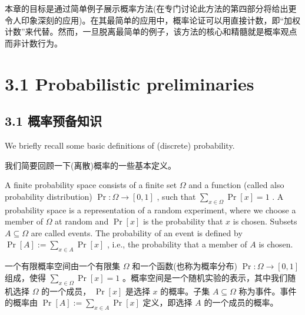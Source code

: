 \documentclass[10pt]{article}
\begin{document}
\begin{tcolorbox}\relax
本章的目标是通过简单例子展示概率方法(在专门讨论此方法的第四部分将给出更令人印象深刻的应用)。在其最简单的应用中，概率论证可以用直接计数，即“加权计数”来代替。然而，一旦脱离最简单的例子，该方法的核心和精髓就是概率观点而非计数行为。
\end{tcolorbox}

\section*{3.1 Probabilistic preliminaries}

\begin{tcolorbox}\relax
\section*{3.1 概率预备知识}
\end{tcolorbox}

We briefly recall some basic definitions of (discrete) probability.

\begin{tcolorbox}\relax
我们简要回顾一下(离散)概率的一些基本定义。
\end{tcolorbox}

A finite probability space consists of a finite set \(\Omega\) and a function (called also probability distribution) \(\Pr  : \Omega  \rightarrow  \left\lbrack  {0,1}\right\rbrack\) , such that \(\mathop{\sum }\limits_{{x \in  \Omega }}\Pr \left\lbrack  x\right\rbrack   = 1\) . A probability space is a representation of a random experiment, where we choose a member of \(\Omega\) at random and \(\Pr \left\lbrack  x\right\rbrack\) is the probability that \(x\) is chosen. Subsets \(A \subseteq  \Omega\) are called events. The probability of an event is defined by \(\Pr \left\lbrack  A\right\rbrack   \mathrel{\text{ := }} \mathop{\sum }\limits_{{x \in  A}}\Pr \left\lbrack  x\right\rbrack\) , i.e., the probability that a member of \(A\) is chosen.

\begin{tcolorbox}\relax
一个有限概率空间由一个有限集 \(\Omega\) 和一个函数(也称为概率分布) \(\Pr  : \Omega  \rightarrow  \left\lbrack  {0,1}\right\rbrack\) 组成，使得 \(\mathop{\sum }\limits_{{x \in  \Omega }}\Pr \left\lbrack  x\right\rbrack   = 1\) 。概率空间是一个随机实验的表示，其中我们随机选择 \(\Omega\) 的一个成员， \(\Pr \left\lbrack  x\right\rbrack\) 是选择 \(x\) 的概率。子集 \(A \subseteq  \Omega\) 称为事件。事件的概率由 \(\Pr \left\lbrack  A\right\rbrack   \mathrel{\text{ := }} \mathop{\sum }\limits_{{x \in  A}}\Pr \left\lbrack  x\right\rbrack\) 定义，即选择 \(A\) 的一个成员的概率。
\end{tcolorbox}
\end{document}
